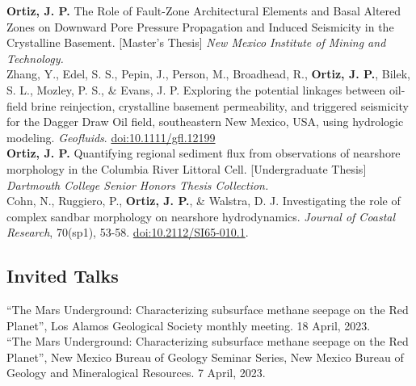 \documentclass[11pt, letterpaper]{article}
\newcommand{\amper}{{\fontspec[Scale=.95]{Adobe Caslon Pro}\selectfont\itshape\&}}
\newcommand{\years}[1]{\marginnote{\scriptsize #1}}
\begin{document}
%
\years{2017}\textbf{Ortiz, J. P.} The Role of Fault-Zone Architectural Elements
and Basal Altered Zones on Downward Pore Pressure Propagation and Induced
Seismicity in the Crystalline Basement. [Master's Thesis] \emph{New Mexico Institute of Mining
and Technology.}\\ 
%
\years{2016}Zhang, Y., Edel, S. S., Pepin, J., Person, M., Broadhead, R.,
\textbf{Ortiz, J. P.}, Bilek, S. L., Mozley, P. S., \& Evans, J.  P. Exploring
the potential linkages between oil-field brine reinjection, crystalline
basement permeability, and triggered seismicity for the Dagger Draw Oil field,
southeastern New Mexico, USA, using hydrologic modeling. \emph{Geofluids}.
\href{https://onlinelibrary.wiley.com/doi/epdf/10.1111/gfl.12199}{doi:10.1111/gfl.12199}\\
%
\years{2014}\textbf{Ortiz, J. P.} Quantifying regional sediment flux from
observations of nearshore morphology in the Columbia River Littoral Cell.
[Undergraduate Thesis] \emph{Dartmouth College Senior Honors Thesis
Collection.}\\ 
%
\years{2014}Cohn, N., Ruggiero, P., \textbf{Ortiz, J. P.}, \& Walstra, D. J.
Investigating the role of complex sandbar morphology on nearshore
hydrodynamics. \emph{Journal of Coastal Research}, 70(sp1), 53-58.
\href{https://bioone.org/journalArticle/Download?urlId=10.2112%2FSI65-010.1}{doi:10.2112/SI65-010.1}.

\hypersetup{linkcolor=black,citecolor=blue,filecolor=black,urlcolor=blue} 


\subsection*{Invited Talks}
\label{sec:invitedTalks}
\years{2023} ``The Mars Underground: Characterizing subsurface methane seepage
on the Red Planet'', Los Alamos Geological Society monthly meeting. 18 April,
2023.\\ 
%
\years{2023} ``The Mars Underground: Characterizing subsurface methane seepage
on the Red Planet'', New Mexico Bureau of Geology Seminar Series, New
Mexico Bureau of Geology and Mineralogical Resources. 7 April, 2023.\\
%



\end{document}
